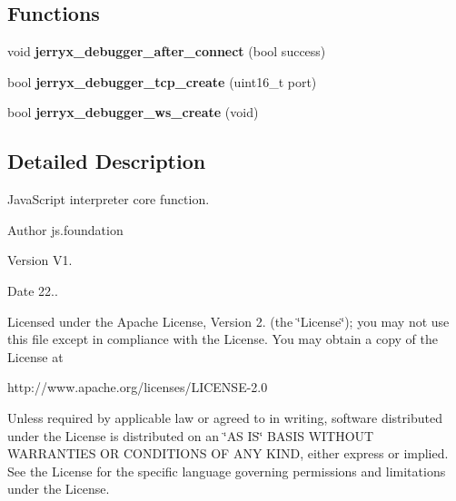 \subsection*{Functions}
\begin{DoxyCompactItemize}
\item 
void \textbf{ jerryx\+\_\+debugger\+\_\+after\+\_\+connect} (bool success)
\item 
bool {\bfseries jerryx\+\_\+debugger\+\_\+tcp\+\_\+create} (uint16\+\_\+t port)
\item 
bool {\bfseries jerryx\+\_\+debugger\+\_\+ws\+\_\+create} (void)
\end{DoxyCompactItemize}


\subsection{Detailed Description}
Java\+Script interpreter core function. 

\begin{DoxyAuthor}{Author}
js.\+foundation 
\end{DoxyAuthor}
\begin{DoxyVersion}{Version}
V1. 
\end{DoxyVersion}
\begin{DoxyDate}{Date}
22.. 
\end{DoxyDate}
Licensed under the Apache License, Version 2. (the \char`\"{}\+License\char`\"{}); you may not use this file except in compliance with the License. You may obtain a copy of the License at \begin{DoxyVerb}http://www.apache.org/licenses/LICENSE-2.0
\end{DoxyVerb}


Unless required by applicable law or agreed to in writing, software distributed under the License is distributed on an \char`\"{}\+A\+S I\+S\char`\"{} B\+A\+S\+IS W\+I\+T\+H\+O\+UT W\+A\+R\+R\+A\+N\+T\+I\+ES OR C\+O\+N\+D\+I\+T\+I\+O\+NS OF A\+NY K\+I\+ND, either express or implied. See the License for the specific language governing permissions and limitations under the License. 